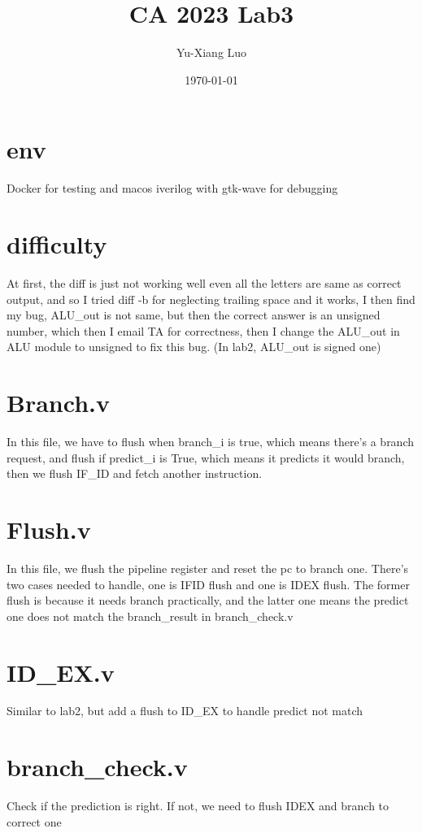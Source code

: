 \documentclass[12pt]{article}
\title{CA 2023 Lab3}
\author{Yu-Xiang Luo}
\date{\today}
\begin{document}
\maketitle

\section* {env} 
Docker for testing and macos iverilog with gtk-wave for debugging

\section* {difficulty}
At first, the diff is just not working well even all the letters are same as correct output, and so I tried diff -b for neglecting trailing space and it works, I then find my bug, ALU\_out is not same, but then the correct answer is an unsigned number, which then I email TA for correctness, then I change the ALU\_out in ALU module to unsigned to fix this bug. (In lab2, ALU\_out is signed one)

\section* {Branch.v}
In this file, we have to flush when branch\_i is true, which means there's a branch request, and flush if predict\_i is True, which means it predicts it would branch, then we flush IF\_ID and fetch another instruction.

\section* {Flush.v}
In this file, we flush the pipeline register and reset the pc to branch one. There's two cases needed to handle, one is IFID flush and one is IDEX flush. The former flush is because it needs branch practically, and the latter one means the predict one does not match the branch\_result in branch\_check.v

\section* {ID\_EX.v}
Similar to lab2, but add a flush to ID\_EX to handle predict not match

\section* {branch\_check.v}
Check if the prediction is right. If not, we need to flush IDEX and branch to correct one
\end{document}
